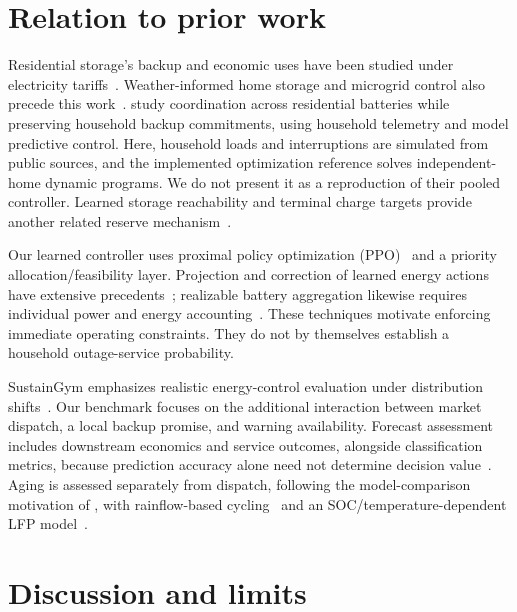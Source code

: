 \documentclass{article}
\begin{document}
\section{Relation to prior work}

Residential storage's backup and economic uses have been studied under electricity tariffs~\citep{gorman2025backup}. Weather-informed home storage and microgrid control also precede this work~\citep{schmitz2020proactive,gutierrezrojas2021weather}. \citet{anunrojwong2026pooling} study coordination across residential batteries while preserving household backup commitments, using household telemetry and model predictive control. Here, household loads and interruptions are simulated from public sources, and the implemented optimization reference solves independent-home dynamic programs. We do not present it as a reproduction of their pooled controller. Learned storage reachability and terminal charge targets provide another related reserve mechanism~\citep{tapia2026reachability}.

Our learned controller uses proximal policy optimization (PPO)~\citep{schulman2017ppo} and a priority allocation/feasibility layer. Projection and correction of learned energy actions have extensive precedents~\citep{chen2021prof,ceusters2023safe,stanojev2023safe,karimimadahi2024control,markgraf2025projection}; realizable battery aggregation likewise requires individual power and energy accounting~\citep{elsaadany2026realizability}. These techniques motivate enforcing immediate operating constraints. They do not by themselves establish a household outage-service probability.

SustainGym emphasizes realistic energy-control evaluation under distribution shifts~\citep{yeh2023sustaingym}. Our benchmark focuses on the additional interaction between market dispatch, a local backup promise, and warning availability. Forecast assessment includes downstream economics and service outcomes, alongside classification metrics, because prediction accuracy alone need not determine decision value~\citep{lin2025accuracy}. Aging is assessed separately from dispatch, following the model-comparison motivation of \citet{humiston2026degradation}, with rainflow-based cycling~\citep{xu2018rainflow} and an SOC/temperature-dependent LFP model~\citep{blastlite}.




\section{Discussion and limits}
\end{document}
